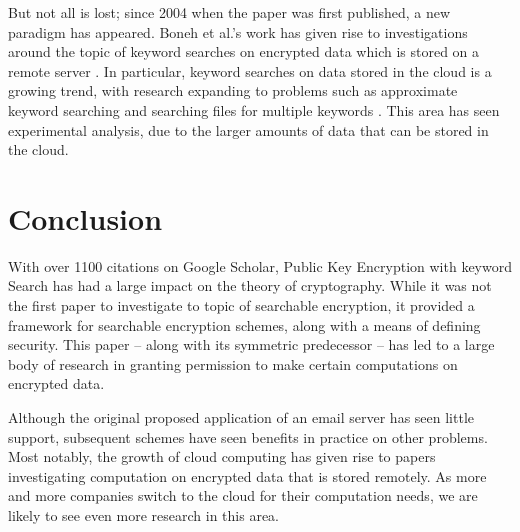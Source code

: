 \documentclass[a4paper,11pt]{article}
\begin{document}
    But not all is lost; since 2004 when the paper was first published, a new paradigm has appeared. Boneh et al.'s work has given rise to investigations around the topic of keyword searches on encrypted data which is stored on a remote server \cite{chang:remote}. In particular, keyword searches on data stored in the cloud is a growing trend, with research expanding to problems such as approximate keyword searching \cite{5462196} and searching files for multiple keywords \cite{6674958}. This area has seen experimental analysis, due to the larger amounts of data that can be stored in the cloud.

    \section{Conclusion}

    With over 1100 citations on Google Scholar, Public Key Encryption with keyword Search has had a large impact on the theory of cryptography. While it was not the first paper to investigate to topic of searchable encryption, it provided a framework for searchable encryption schemes, along with a means of defining security. This paper -- along with its symmetric predecessor -- has led to a large body of research in granting permission to make certain computations on encrypted data.

    Although the original proposed application of an email server has seen little support, subsequent schemes have seen benefits in practice on other problems. Most notably, the growth of cloud computing has given rise to papers investigating computation on encrypted data that is stored remotely. As more and more companies switch to the cloud for their computation needs, we are likely to see even more research in this area.

    
\end{document}
